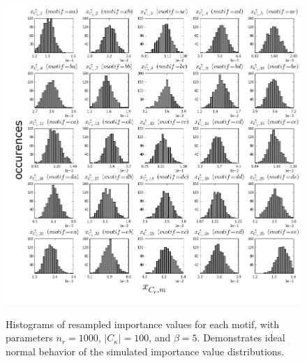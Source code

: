 \begin{enumerate}
\begin{figure}
  \includegraphics[scale=0.35]{./Figures/5x5hist.png}\\
  \caption{Histograms of resampled importance values for each motif, with parameters $n_r=1000$, $|C_\kappa|=100$, and $\beta=5$. Demonstrates ideal normal behavior of the simulated importance value distributions.}\label{fig:5x5_hist}
\end{figure}
\begin{figure}

\end{figure}
\end{enumerate}
